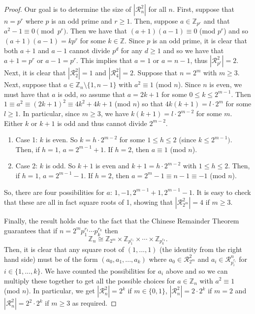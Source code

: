\documentclass[12pt]{amsart}
\numberwithin{equation}{section}
\theoremstyle{definition}
\newcommand{\Z}{\mathbb{Z}}
\renewcommand{\Z}{\mathbb{Z}}
\begin{document}
\begin{proof}
Our goal is to determine the size of $|\mathcal{R}_n^2|$ for all $n$. First, suppose that $n=p^r$ where $p$ is an odd prime and $r\geq
  1$. Then, suppose $a\in\Z_{p^r}$ and that $a^2-1\equiv 0\pmod{p^r}$. Then
  we have that $(a+1)(a-1)\equiv 0$ (mod $p^r$) and so
  $(a+1)(a-1)=kp^r$ for some $k\in\Z$. Since $p$ is an odd prime, it
  is clear that both $a+1$ and $a-1$ cannot divide $p^d$ for any
  $d\geq 1$ and so we have that $a+1=p^r$ or $a-1=p^r$. This implies
  that $a=1$ or $a=n-1$, thus $|\mathcal{R}_{p^r}^2|=2$.  Next, it is
  clear that $|\mathcal{R}_2^2|=1$ and $|\mathcal{R}_4^2|=2$. Suppose that $n=2^m$ with $m\geq 3$. Next, suppose that
  $a\in\Z_n\setminus\{1,n-1\}$ with $a^2\equiv 1$ (mod $n$). Since $n$
  is even, we must have that $a$ is odd, so assume that $a=2k+1$ for
  some $0\leq k\leq 2^{m-1}$. Then $1\equiv a^2\equiv (2k+1)^2\equiv
  4k^2+4k+1$ (mod $n$) so that $4k(k+1)=l\cdot 2^m$ for some $l\geq
  1$. In particular, since $m\geq 3$, we have $k(k+1)=l\cdot 2^{m-2}$
  for some $m$. Either $k$ or $k+1$ is odd and thus cannot divide
  $2^{m-2}$.
\begin{enumerate}
\item[] Case 1: $k$ is even. So $k=h\cdot 2^{m-2}$ for some $1\leq
  h\leq 2$ (since $k\leq 2^{m-1})$. Then, if $h=1$, $a=2^{m-1}+1$. If
  $h=2$, then $a\equiv 1$ (mod $n$).
 
\item[] Case 2: $k$ is odd. So $k+1$ is even and $k+1=h\cdot 2^{m-2}$
  with $1\leq h\leq 2$. Then, if $h=1$, $a=2^{m-1}-1$. If $h=2$, then
  $a=2^m-1\equiv n-1\equiv -1$ (mod $n$).
\end{enumerate}

So, there are four possibilities for $a$:
$1,-1,2^{m-1}+1,2^{m-1}-1$. It is easy to check that these are all in
fact square roots of 1, showing that $|\mathcal{R}_{2^m}^2|=4$ if $m\geq 3$.

Finally, the result holds due to the fact that the Chinese Remainder
Theorem guarantees that if $n=2^mp_1^{r_1}\cdots p_k^{r_k}$ then
$$\Z_n\cong \Z_{2^m}\times\Z_{p_1^{r_1}}\times\cdots\times \Z_{p_k^{r_k}}.$$
Then, it is clear that any square root of $(1,...,1)$ (the identity
from the right hand side) must be of the form $(a_0,a_1,...,a_k)$
where $a_0\in\mathcal{R}_{2^m}^2$ and $a_i\in\mathcal{R}_{p_i^{r_i}}^n$ for $i\in\{1,...,k\}$. We have counted the possibilities for $a_i$ above and so we can multiply these
together to get all the possible choices for $a\in\Z_n$ with
$a^2\equiv 1$ (mod $n$). In particular, we get $|\mathcal{R}_n^2|=2^k$ if $m\in\{0,1\}$, $|\mathcal{R}_n^2|=2\cdot2^k$ if $m=2$ and $|\mathcal{R}_n^2|=2^2\cdot2^k$ if $m\geq 3$ as required.
\end{proof}





\end{document}
